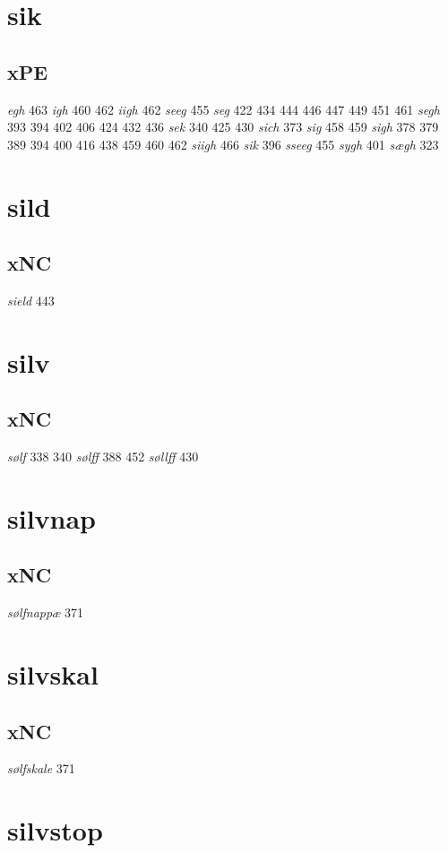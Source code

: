 \documentclass[a4paper,twocolumn]{article}
\begin{document}
\section{sik}
\label{sec:org2bd7d91}
\subsection{xPE}
\label{sec:org05c3cfa}
\emph{egh} 463 \emph{igh} 460 462 \emph{iigh} 462 \emph{seeg} 455 \emph{seg} 422 434 444 446 447 449 451 461 \emph{segh} 393 394 402 406 424 432 436 \emph{sek} 340 425 430 \emph{sich} 373 \emph{sig} 458 459 \emph{sigh} 378 379 389 394 400 416 438 459 460 462 \emph{siigh} 466 \emph{sik} 396 \emph{sseeg} 455 \emph{sygh} 401 \emph{sægh} 323 
\section{sild}
\label{sec:orgc3a3cbd}
\subsection{xNC}
\label{sec:orgeee829d}
\emph{sield} 443 
\section{silv}
\label{sec:org971d7e6}
\subsection{xNC}
\label{sec:orgdab01b8}
\emph{sølf} 338 340 \emph{sølff} 388 452 \emph{søllff} 430 
\section{silvnap}
\label{sec:orga2b6308}
\subsection{xNC}
\label{sec:org08b014c}
\emph{sølfnappæ} 371 
\section{silvskal}
\label{sec:org6f66a39}
\subsection{xNC}
\label{sec:org6d83a2f}
\emph{sølfskale} 371 
\section{silvstop}
\label{sec:org8aff968}
\end{document}
